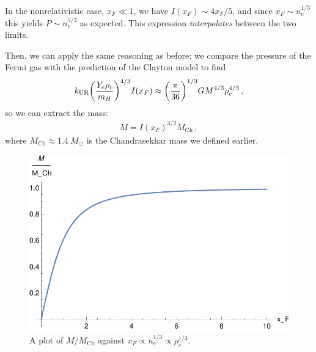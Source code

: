 \documentclass[main.tex]{subfiles}
\begin{document}
In the nonrelativistic case, \(x_F \ll 1\), we have \(I(x_F) \sim 4 x_F / 5\), and since \(x_F \sim n_e^{1/3}\) this yields \(P \sim n_e^{5/3}\) as expected. 
This expression \emph{interpolates} between the two limits.

Then, we can apply the same reasoning as before: we compare the pressure of the Fermi gas with the prediction of the Clayton model to find
%
\begin{align}
k _{\text{UR}} \qty(\frac{Y_e \rho_{c}}{m_H})^{4/3} I(x_F)
\approx \qty(\frac{\pi }{36})^{1/3} G M^{4/3} \rho_{c}^{4/3}
\,,
\end{align}
%
so we can extract the mass: 
%
\begin{align}
M = I(x_F)^{3/2} M _{\text{Ch}}
\,,
\end{align}
%
where \(M _{\text{Ch}} \approx \SI{1.4}{M_{\odot}}\) is the Chandrasekhar mass we defined earlier.

\begin{figure}[ht]
\centering
\includegraphics[width=\textwidth]{figures/chandrasekhar_limit.pdf}
\caption{A plot of \(M / M _{\text{Ch}}\) against \(x_F \propto n_e^{1/3} \propto \rho _c^{1/3}\).}
\label{chandra}
\end{figure}

\end{document}
